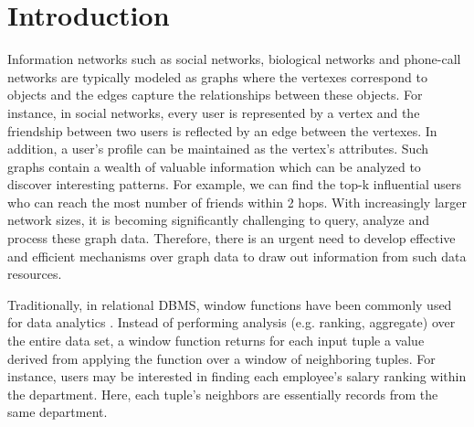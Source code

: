 \section{Introduction}
Information networks such as social networks, biological networks and
phone-call networks are typically modeled as graphs \cite{chen2008graph}
where the vertexes correspond to objects and the edges
capture the relationships between these objects.
For instance, in social networks, every user is represented by
a vertex and the friendship between two users is reflected by an edge between
the vertexes. In addition, a user's profile can be maintained as
the vertex's attributes. Such graphs contain a wealth of valuable 
information which can be analyzed to discover interesting patterns. 
For example, we can find the top-k influential users who can 
reach the most number of friends within 2 hops. With increasingly
larger network sizes, it is becoming significantly challenging to 
query, analyze and process these graph data. Therefore, there is an urgent need 
to develop effective and efficient mechanisms over graph data to draw out
information from such data resources.
 
Traditionally, in relational DBMS, window functions have been commonly
used for data analytics \cite{cao2012optimization, bellamkonda2013adaptive}. Instead of performing analysis (e.g. ranking, 
aggregate) over the entire data set, a window function returns for each 
input tuple a value derived from applying the function over a window of 
neighboring tuples. For instance, users may be interested in finding 
each employee's salary ranking within the department. Here,
each tuple's neighbors are essentially records from the same department.


